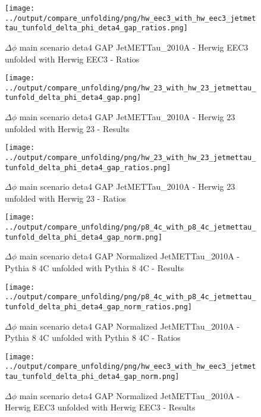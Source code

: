 \documentclass[11pt]{book}
\begin{document}
\begin{figure}[ht]
\centering
\texttt{[image: ../output/compare\_unfolding/png/hw\_eec3\_with\_hw\_eec3\_jetmettau\_tunfold\_delta\_phi\_deta4\_gap\_ratios.png]}
\caption{$\Delta\phi$ main scenario deta4 GAP JetMETTau\_2010A - Herwig EEC3 unfolded with Herwig EEC3 - Ratios}
\label{hw_eec3_hw_eec3_jetmettau_tunfold_delta_phi_deta4_gap_b}
\end{figure}

\begin{figure}[ht]
\centering
\texttt{[image: ../output/compare\_unfolding/png/hw\_23\_with\_hw\_23\_jetmettau\_tunfold\_delta\_phi\_deta4\_gap.png]}
\caption{$\Delta\phi$ main scenario deta4 GAP JetMETTau\_2010A - Herwig 23 unfolded with Herwig 23 - Results}
\label{hw_23_hw_23_jetmettau_tunfold_delta_phi_deta4_gap_a}
\end{figure}

\begin{figure}[ht]
\centering
\texttt{[image: ../output/compare\_unfolding/png/hw\_23\_with\_hw\_23\_jetmettau\_tunfold\_delta\_phi\_deta4\_gap\_ratios.png]}
\caption{$\Delta\phi$ main scenario deta4 GAP JetMETTau\_2010A - Herwig 23 unfolded with Herwig 23 - Ratios}
\label{hw_23_hw_23_jetmettau_tunfold_delta_phi_deta4_gap_b}
\end{figure}



\begin{figure}[ht]
\centering
\texttt{[image: ../output/compare\_unfolding/png/p8\_4c\_with\_p8\_4c\_jetmettau\_tunfold\_delta\_phi\_deta4\_gap\_norm.png]}
\caption{$\Delta\phi$ main scenario deta4 GAP Normalized JetMETTau\_2010A - Pythia 8 4C unfolded with Pythia 8 4C - Results}
\label{p8_p8_jetmettau_tunfold_delta_phi_deta4_gap_norm_a}
\end{figure}

\begin{figure}[ht]
\centering
\texttt{[image: ../output/compare\_unfolding/png/p8\_4c\_with\_p8\_4c\_jetmettau\_tunfold\_delta\_phi\_deta4\_gap\_norm\_ratios.png]}
\caption{$\Delta\phi$ main scenario deta4 GAP Normalized JetMETTau\_2010A - Pythia 8 4C unfolded with Pythia 8 4C - Ratios}
\label{p8_p8_jetmettau_tunfold_delta_phi_deta4_gap_norm_b}
\end{figure}

\begin{figure}[ht]
\centering
\texttt{[image: ../output/compare\_unfolding/png/hw\_eec3\_with\_hw\_eec3\_jetmettau\_tunfold\_delta\_phi\_deta4\_gap\_norm.png]}
\caption{$\Delta\phi$ main scenario deta4 GAP Normalized JetMETTau\_2010A - Herwig EEC3 unfolded with Herwig EEC3 - Results}
\label{hw_eec3_hw_eec3_jetmettau_tunfold_delta_phi_deta4_gap_norm_a}
\end{figure}
\end{document}
